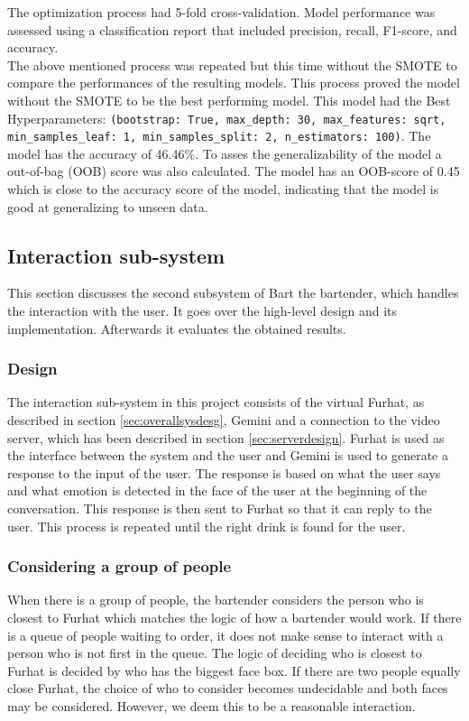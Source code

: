 \documentclass[conference]{IEEEtran}
\begin{document}
The optimization process had 5-fold cross-validation.
Model performance was assessed using a classification report that included precision, recall, F1-score, and accuracy.
\\The above mentioned process was repeated but this time without the SMOTE to compare the performances of the resulting models. This process proved the model without the SMOTE to be the best performing model. This model had the Best Hyperparameters: 
\texttt{(bootstrap: True, max\_depth: 30, max\_features: sqrt, min\_samples\_leaf: 1, min\_samples\_split: 2, n\_estimators: 100)}. The model has the accuracy of 46.46\%. To asses the generalizability of the model a out-of-bag (OOB) score was also calculated. The model has an OOB-score of 0.45 which is close to the accuracy score of the model, indicating that the model is good at generalizing to unseen data\cite{OOB}.\\

\subsection{Interaction sub-system} %
This section discusses the second subsystem of Bart the bartender, which handles the interaction with the user. 
It goes over the high-level design and its implementation. 
Afterwards it evaluates the obtained results.

\subsubsection{Design}
The interaction sub-system in this project consists of the virtual Furhat, as described in section \ref{sec:overallsysdesg}, Gemini and a connection to the video server, which has been described in section \ref{sec:serverdesign}.
Furhat is used as the interface between the system and the user and Gemini is used to generate a response to the input of the user.
The response is based on what the user says and what emotion is detected in the face of the user at the beginning of the conversation.
This response is then sent to Furhat so that it can reply to the user.
This process is repeated until the right drink is found for the user.

\subsubsection{Considering a group of people}
When there is a group of people, the bartender considers the person who is closest to Furhat which matches the logic of how a bartender would work. If there is a queue of people waiting to order, it does not make sense to interact with a person who is not first in the queue. The logic of deciding who is closest to Furhat is decided by who has the biggest face box. If there are two people equally close Furhat, the choice of who to consider becomes undecidable and both faces may be considered. However, we deem this to be a reasonable interaction.
\end{document}
